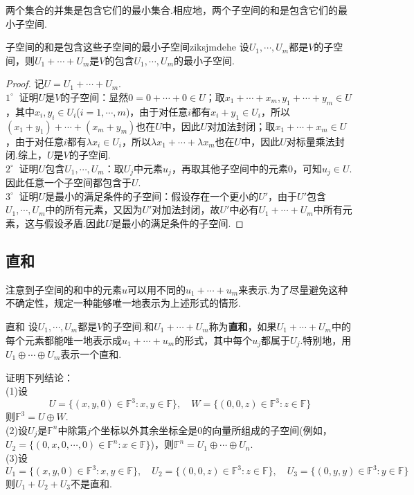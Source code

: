 \documentclass[lang=cn, zihao=5]{elegantbook}
\newcommand{\F}{\mathbb{F}}
\newcommand{\buzhou}[1]{$#1^{\circ} \ $}
\begin{document}
两个集合的并集是包含它们的最小集合.相应地，两个子空间的和是包含它们的最小子空间.

\begin{proposition}{子空间的和是包含这些子空间的最小子空间}{ziksjmdehe}
    设$U_1,\cdots ,U_m$都是$V$的子空间，则$U_1+\cdots +U_m$是$V$的包含$U_1,\cdots ,U_m$的最小子空间.
\end{proposition}
\begin{proof}
    记$U=U_1+\cdots +U_m$. \\
    \buzhou{1} 证明$U$是$V$的子空间：显然$0=0 + \cdots + 0 \in U$；取$x_1+ \cdots +x_m,y_1+ \cdots +y_m \in U$，其中$x_i,y_i \in U_i$($i=1,\cdots ,m$)，由于对任意$i$都有$x_i+y_1 \in U_i$，所以$(x_1+y_1) + \cdots + (x_m+y_m)$也在$U$中，因此$U$对加法封闭；取$x_1+ \cdots +x_m \in U$，由于对任意$i$都有$\lambda x_i \in U_i$，所以$\lambda x_1 + \cdots + \lambda x_m$也在$U$中，因此$U$对标量乘法封闭.综上，$U$是$V$的子空间.\\
    \buzhou{2} 证明$U$包含$U_1,\cdots ,U_m$：取$U_j$中元素$u_j$，再取其他子空间中的元素$0$，可知$u_j \in U$.因此任意一个子空间都包含于$U$. \\
    \buzhou{3} 证明$U$是最小的满足条件的子空间：假设存在一个更小的$U'$，由于$U'$包含$U_1, \cdots ,U_m$中的所有元素，又因为$U'$对加法封闭，故$U'$中必有$U_1+ \cdots +U_m$中所有元素，这与假设矛盾.因此$U$是最小的满足条件的子空间.
\end{proof}

\subsection{直和}

注意到子空间的和中的元素$u$可以用不同的$u_1+ \cdots + u_m$来表示.为了尽量避免这种不确定性，规定一种能够唯一地表示为上述形式的情形.

\begin{definition}{直和}
    设$U_1,\cdots ,U_m$都是$V$的子空间.和$U_1 + \cdots + U_m$称为\textbf{直和}，如果$U_1+ \cdots +U_m$中的每个元素都能唯一地表示成$u_1+ \cdots + u_m$的形式，其中每个$u_j$都属于$U_j$.特别地，用$U_1 \oplus \cdots \oplus U_m$表示一个直和.
\end{definition}

\begin{example}
    证明下列结论： \\
    (1)设$$U = \{ (x,y,0) \in \F ^{3} : x,y \in \F \}, \quad W = \{ (0,0,z) \in \F ^{3} : z \in \F \}$$
    则$\F ^{3} = U \oplus W$. \\
    (2)设$U_j$是$\F ^{n}$中除第$j$个坐标以外其余坐标全是$0$的向量所组成的子空间(例如，$U_2= \{ (0,x,0,\cdots ,0) \in \F ^{n} : x \in \F \}$)，则$\F ^{n} = U_1 \oplus \cdots \oplus U_n$. \\
    (3)设$$U_1 = \{ (x,y,0) \in \F ^{3} : x,y \in \F \}, \quad U_2 = \{ (0,0,z) \in \F ^{3} : z \in \F \}, \quad U_3 = \{ (0,y,y) \in \F ^{3} : y \in \F \}$$
    则$U_1+U_2+U_3$不是直和.
\end{example}
\end{document}
